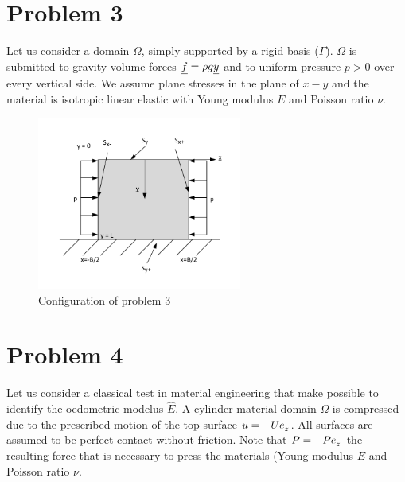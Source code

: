 \documentclass[letter,12pt]{article}
\begin{document}
\newpage
\section*{Problem 3}
Let us consider a domain $\Omega$, simply supported by a rigid basis ($\Gamma$). $\Omega$ is submitted to gravity volume forces $\underline{f} = \rho g \underline{y} $ and to uniform pressure $p > 0$ over every vertical side. We assume plane stresses in the plane of $x-y$ and the material is isotropic linear elastic with Young modulus $E$ and Poisson ratio $\nu$. \\

\begin{figure}[ht]
	\centering
	\includegraphics[width=0.6\textwidth]{figures/p3}
	\caption{Configuration of problem 3}
	\label{fig:problem3}
\end{figure}





\newpage
\section*{Problem 4}
Let us consider a classical test in material engineering that make possible to identify the oedometric  modelus $\hat{E}$. A cylinder material domain $\Omega$ is compressed due to the prescribed motion of the top surface $\underline{u} = -U \underline{e}_z $. All surfaces are assumed to be perfect contact without friction. Note that $\underline{P} = -P \underline{e}_z$ the resulting force that is necessary to press the materials (Young modulus $E$ and Poisson ratio $\nu$. \\
\end{document}
